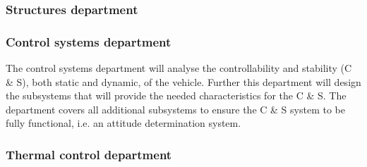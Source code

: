 \subsubsection{Structures department}\label{subsec:struct}

\subsubsection{Control systems department}\label{subsec:control}
The control systems department will analyse the controllability and stability (C \& S), both static and dynamic, of the vehicle. Further this department will design the subsystems that will provide the needed characteristics for the C \& S. The department covers all additional subsystems to ensure the C \& S system to be fully functional, i.e. an attitude determination system.


\subsubsection{Thermal control department}\label{subsec:therm}
